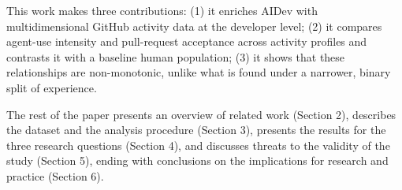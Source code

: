 This work makes three contributions: (1) it enriches AIDev with multidimensional GitHub activity data at the developer level; (2) it compares agent-use intensity and pull-request acceptance across activity profiles and contrasts it with a baseline human population; (3) it shows that these relationships are non-monotonic, unlike what is found under a narrower, binary split of experience.

The rest of the paper presents an overview of related work (Section 2), describes the dataset and the analysis procedure (Section 3), presents the results for the three research questions (Section 4), and discusses threats to the validity of the study (Section 5), ending with conclusions on the implications for research and practice (Section 6).
